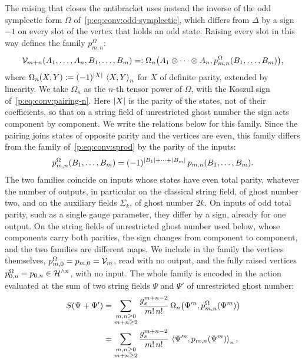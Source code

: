 The raising that closes the antibracket uses instead the inverse of the odd symplectic form $\Omega$ of~\eqref{p:eq:conv:odd-symplectic}, which differs from $\Delta$ by a sign $-1$ on every slot of the vertex that holds an odd state.
Raising every slot in this way defines the family $p^{\Omega}_{m, n}$:
\begin{equation}
  \label{p:eq:ibl:raised-family}
  \vertex{m+n}(A_1, \ldots, A_n, B_1, \ldots, B_m)
    =: \Omega_n \bigl( A_1 \otimes \cdots \otimes A_n, p^{\Omega}_{m, n}(B_1, \ldots, B_m) \bigr),
\end{equation}
where $\Omega_n(X, Y) := (-1)^{\abs{X}} \, \pair[n]{X}{Y}$ for $X$ of definite parity, extended by linearity.
We take $\Omega_n$ as the $n$-th tensor power of $\Omega$, with the Koszul sign of~\eqref{p:eq:conv:pairing-n}.
Here $\abs{X}$ is the parity of the states, not of their coefficients, so that on a string field of unrestricted ghost number the sign acts component by component.
We write the relations below for this family.
  Since the pairing joins states of opposite parity and the vertices are even, this family differs from the family of~\eqref{p:eq:conv:sprod} by the parity of the inputs:
\begin{equation}
  \label{p:eq:ibl:raised-vs-sprod}
  p^{\Omega}_{m, n}(B_1, \ldots, B_m)
    = (-1)^{\abs{B_1} + \cdots + \abs{B_m}} \, \sprod{m}{n}(B_1, \ldots, B_m).
\end{equation}
The two families coincide on inputs whose states have even total parity, whatever the number of outputs, in particular on the classical string field, of ghost number two, and on the auxiliary fields $\Sigma_k$, of ghost number $2k$.
On inputs of odd total parity, such as a single gauge parameter, they differ by a sign, already for one output.
On the string fields of unrestricted ghost number used below, whose components carry both parities, the sign changes from component to component, and the two families are different maps.
We include in the family the vertices themselves, $p^{\Omega}_{m, 0} = \sprod{m}{0} = \vertex{m}$, read with no output, and the fully raised vertices $p^{\Omega}_{0, n} = \sprod{0}{n} \in \Hn{n}$, with no input.
The whole family is encoded in the action evaluated at the sum of two string fields $\Psi$ and $\Psi'$ of unrestricted ghost number:
\begin{equation}
  \label{p:eq:ibl:generating}
  \begin{aligned}
    S(\Psi + \Psi')
      &
      = \sum_{\substack{m, n \ge 0 \\ m + n \ge 2}} \frac{\gs^{m+n-2}}{m! \, n!} \, \Omega_n \bigl( \Psi'^n, p^{\Omega}_{m, n}(\Psi^m) \bigr)
    \\
      &
      = \sum_{\substack{m, n \ge 0 \\ m + n \ge 2}} \frac{\gs^{m+n-2}}{m! \, n!} \, \pair[n]{\Psi'^n}{\sprod{m}{n}(\Psi^m)},
  \end{aligned}
\end{equation}
